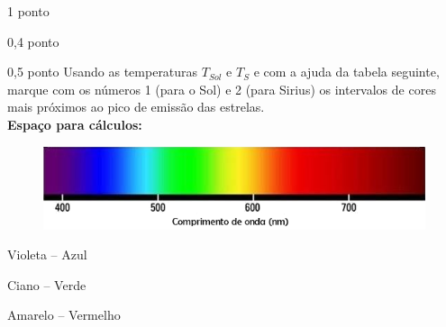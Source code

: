 \documentclass{../lista}
\begin{document}
\begin{questao}{1 ponto}
\begin{pergunta}{0,4 ponto}
			\espacoCalculo
			\espacoRespostaPergunta
		\end{pergunta}

		\begin{pergunta}{0,5 ponto}
			Usando as temperaturas $T_{Sol}$ e $T_S$ e com a ajuda da tabela seguinte, marque com os números 1 (para o Sol) e 2 (para Sirius) os intervalos de cores mais próximos ao pico de emissão das estrelas. \\

			\textbf{Espaço para cálculos:}
			\espacoCalculo

			\begin{figure}[H]
				\centering
				\includegraphics[scale=0.5]{./img/4.png}
			\end{figure}
			\begin{multicols}{3} \begin{alternativas}
				\item Violeta -- Azul
				\item Ciano -- Verde
				\item Amarelo -- Vermelho
			\end{alternativas} \end{multicols}
		\end{pergunta}
	\end{questao}
\end{document}
